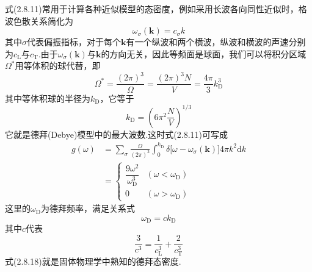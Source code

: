 式(2.8.11)常用于计算各种近似模型的态密度，例如采用长波各向同性近似时，格波色散关系简化为
\begin{equation}
  \omega_{\sigma}(\boldsymbol{k})=c_{\sigma}k
\end{equation}
其中$\sigma$代表偏振指标，对于每个$\boldsymbol{k}$有一个纵波和两个横波，纵波和横波的声速分别为$c_{\mathrm{L}}$与$c_{\mathrm{T}}$.由于$\omega_{\sigma}(\boldsymbol{k})$与$\boldsymbol{k}$的方向无关，因此等频面是球面，我们可以将积分区域$\Omega^{*}$用等体积的球代替，即
\begin{equation*}
  \Omega^{*}=\frac{(2\pi)^3}{\Omega}
  =\frac{(2\pi)^3N}{V}=\frac{4\pi}{3}k_{\mathrm{D}}^3
\end{equation*}
其中等体积球的半径为$k_{\mathrm{D}}$，它等于
\begin{equation}
  k_{\mathrm{D}}=\left(6\pi^2\frac{N}{V}\right)^{1/3}
\end{equation}
它就是德拜(Debye)模型中的最大波数.这时式(2.8.11)可写成
\begin{equation}
\begin{aligned}
  g(\omega)&=\sum_{\sigma}\frac{\Omega}{(2\pi)^3}\int_0^{k_{\mathrm{D}}}
  \delta\bigl[\omega-\omega_{\sigma}(\boldsymbol{k})\bigr]4\pi k^2\mathrm{d}k\\
  &=\begin{cases}
  \dfrac{9\omega^2}{\omega_{\mathrm{D}}^3}&(\omega<\omega_{\mathrm{D}})\\[2ex]
  0&(\omega>\omega_{\mathrm{D}})
  \end{cases}
\end{aligned}
\end{equation}
这里的$\omega_{\mathrm{D}}$为德拜频率，满足关系式
\begin{equation}
  \omega_{\mathrm{D}}=ck_{\mathrm{D}}
\end{equation}
其中$c$代表
\begin{equation*}
  \frac{3}{c^3}=\frac{1}{c_{\mathrm{L}}^3}+\frac{2}{c_{\mathrm{T}}^3}
\end{equation*}
式(2.8.18)就是固体物理学中熟知的德拜态密度.

